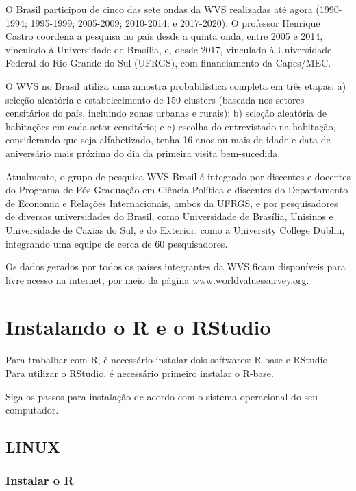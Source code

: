 \documentclass[
  10pt,
  brazil,
  a4paper,
  twoside, notitlepage, openright]{book}
\begin{document}
O Brasil participou de cinco das sete ondas da WVS realizadas até agora (1990-1994; 1995-1999; 2005-2009; 2010-2014; e 2017-2020). O professor Henrique Castro coordena a pesquisa no país desde a quinta onda, entre 2005 e 2014, vinculado à Universidade de Brasília, e, desde 2017, vinculado à Universidade Federal do Rio Grande do Sul (UFRGS), com financiamento da Capes/MEC.

O WVS no Brasil utiliza uma amostra probabilística completa em três etapas: a) seleção aleatória e estabelecimento de 150 clusters (baseada nos setores censitários do país, incluindo zonas urbanas e rurais); b) seleção aleatória de habitações em cada setor censitário; e c) escolha do entrevistado na habitação, considerando que seja alfabetizado, tenha 16 anos ou mais de idade e data de aniversário mais próxima do dia da primeira visita bem-sucedida.

Atualmente, o grupo de pesquisa WVS Brasil é integrado por discentes e docentes do Programa de Pós-Graduação em Ciência Política e discentes do Departamento de Economia e Relações Internacionais, ambos da UFRGS, e por pesquisadores de diversas universidades do Brasil, como Universidade de Brasília, Unisinos e Universidade de Caxias do Sul, e do Exterior, como a University College Dublin, integrando uma equipe de cerca de 60 pesquisadores.

Os dados gerados por todos os países integrantes da WVS ficam disponíveis para livre acesso na internet, por meio da página \url{www.worldvaluessurvey.org}.

\hypertarget{instalando-o-r-e-o-rstudio}{%
\chapter{Instalando o R e o RStudio}\label{instalando-o-r-e-o-rstudio}}

Para trabalhar com R, é necessário instalar dois softwares: R-base e RStudio. Para utilizar o RStudio, é necessário primeiro instalar o R-base.

Siga os passos para instalação de acordo com o sistema operacional do seu computador.

\hypertarget{linux}{%
\section{LINUX}\label{linux}}

\hypertarget{instalar-o-r}{%
\subsection{Instalar o R}\label{instalar-o-r}}
\end{document}
